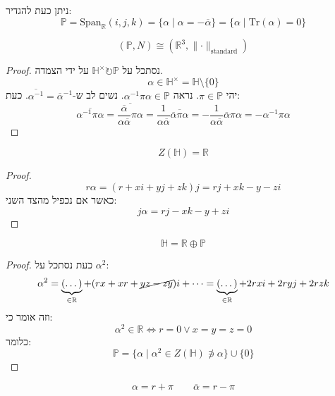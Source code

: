 \documentclass{tstextbook}
\begin{document}
\begin{definition}
ניתן כעת להגדיר:
$$\mathbb{P} =\mathrm{Span}_{\mathbb{R}}(i,j,k)=\{ \alpha \mid \alpha=-\overline{\alpha}  \}=\{ \alpha \mid \mathrm{Tr}(\alpha)=0 \}$$

\end{definition}
\begin{proposition}
$$(\mathbb{P} ,N)\cong (\mathbb{R}^{3},\lVert \cdot \rVert _{\text{standard}})$$

\end{proposition}
\begin{proof}
נסתכל על \(\mathbb{H}^{\times}\circlearrowright \mathbb{P}\) על ידי הצמדה.
$$\alpha \in \mathbb{H} ^{\times}= \mathbb{H} \setminus  \{ 0 \}$$
יהי \(\pi \in \mathbb{P}\). נראה \(\alpha ^{-1}\pi \alpha \in \mathbb{P}\). נשים לב ש-\(\overline{\alpha ^{-1}}=\overline{\alpha}^{-1}\). כעת:
$$\overline{\alpha ^{-1}  \pi \alpha}=\overline{\frac{\overline{\alpha}}{\alpha \overline{\alpha} } \pi \alpha}= \frac{1}{\alpha \overline{\alpha} }\overline{\overline{\alpha} \pi \alpha} =-\frac{1}{\alpha \overline{\alpha} }\overline{\alpha} \pi \alpha=-\alpha ^{-1}  \pi \alpha$$

\end{proof}
\begin{proposition}
$$Z(\mathbb{H} )= \mathbb{R}$$

\end{proposition}
\begin{proof}
$$r\alpha=(r+x i + yj + zk)j=rj+xk-y-zi$$
כאשר אם נכפיל מהצד השני:
$$j\alpha=rj-xk-y+zi$$

\end{proof}
\begin{proposition}
$$\mathbb{H} = \mathbb{R}\oplus \mathbb{P} $$

\end{proposition}
\begin{proof}
כעת נסתכל על \(\alpha^{2}\):
$$\alpha^{2}=\underbrace{ (\dots) }_{ \in \mathbb{R} }+(rx+xr+\cancel{ yz-zy })i+\dots=\underbrace{ (\dots) }_{ \in \mathbb{R} }+2rx i+2ryj+2rzk$$
וזה אומר כי:
$$\alpha^{2}\in \mathbb{R} \iff r = 0 \lor x=y=z=0$$
כלומר:
$$\mathbb{P} = \{ \alpha \mid \alpha^{2}\in Z(\mathbb{H} )\not\ni \alpha  \}\cup  \{  0 \}$$

\end{proof}
\begin{corollary}
$$\alpha=r+\pi \qquad \overline{\alpha} =r-\pi$$

\end{corollary}
\end{document}
